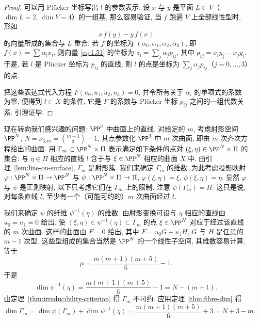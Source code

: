 \begin{proof}
	可以用 Plücker 坐标写出 $l$ 的参数表示: 设 $x$ 与 $y$ 是平面 $L \subset V$（$\dim L = 2$, $\dim V = 4$）的一组基, 那么容易验证, 当 $f$ 跑遍 $V$ 上全部线性型时, 形如
	\begin{equation}
		\label{eq:1.51}
		x\, f(y) - y\, f(x)
	\end{equation}
	的向量所成的集合与 $L$ 重合. 若 $f$ 的坐标为 $(\alpha_0, \alpha_1, \alpha_2, \alpha_3)$, 即 $f(x) = \sum \alpha_i x_i$, 则向量 \eqref{eq:1.51} 的坐标为 $z_i = \sum_j \alpha_j p_{ij}$, 其中 $p_{ij} = x_i y_j - x_j y_i$. 于是, 若 $l$ 是 Plücker 坐标为 $p_{ij}$ 的直线, 则 $l$ 的点是坐标为 $\sum_j \alpha_j p_{ij}$（$j = 0, \ldots, 3$）的点.

	把这些表达式代入方程 $F(u_0, u_1, u_2, u_3) = 0$, 并令所有关于 $\alpha_i$ 的单项式的系数为零, 便得到 $l \subset X$ 的条件, 它是 $F$ 的系数与 Plücker 坐标 $p_{ij}$ 之间的一组代数关系. 引理证毕.
\end{proof}

现在转向我们感兴趣的问题: $\PP^3$ 中曲面上的直线. 对给定的 $m$, 考虑射影空间 $\PP^N$, $N = \nu_{3,m} = \binom{m+3}{3} - 1$, 其点参数化 $\PP^3$ 中 $m$ 次曲面, 即由 $m$ 次齐次方程给出的曲面. 用 $\Gamma_m \subset \PP^N \times \Pi$ 表示满足如下条件的点对 $(\xi, \eta) \in \PP^N \times \Pi$ 的集合: 与 $\eta \in \Pi$ 相应的直线 $l$ 含于与 $\xi \in \PP^N$ 相应的曲面 $X$ 中. 由引理~\ref{lem:line-on-surface}, $\Gamma_m$ 是射影簇. 我们来确定 $\Gamma_m$ 的维数. 为此考虑投影映射 $\varphi: \PP^N \times \Pi \to \PP^N$ 与 $\psi: \PP^N \times \Pi \to \Pi$, $\varphi(\xi, \eta) = \xi$, $\psi(\xi, \eta) = \eta$. 显然 $\varphi$ 与 $\psi$ 是正则映射, 以下只考虑它们在 $\Gamma_m$ 上的限制. 注意 $\psi(\Gamma_m) = \Pi$: 这只是说, 对每条直线 $l$, 至少有一个（可能可约的）$m$ 次曲面经过 $l$.

	我们来确定 $\psi$ 的纤维 $\psi^{-1}(\eta)$ 的维数. 由射影变换可设与 $\eta$ 相应的直线由 $u_0 = u_1 = 0$ 给出. 使 $(\xi, \eta) \in \psi^{-1}(\eta) \subset \Gamma_m$ 的点 $\xi \in \PP^N$ 对应于经过该直线的 $m$ 次曲面. 这样的曲面由 $F = 0$ 给出, 其中 $F = u_0 G + u_1 H$, $G$ 与 $H$ 是任意的 $m-1$ 次型. 这些型组成的集合当然是 $\PP^N$ 的一个线性子空间, 其维数容易计算, 等于
	\begin{equation}
		\label{eq:1.52}
		\mu = \frac{m(m+1)(m+5)}{6} - 1.
	\end{equation}
	于是
	\[
		\dim \psi^{-1}(\eta) = \frac{m(m+1)(m+5)}{6} - 1 = N - (m+1).
	\]
	由定理~\ref{thm:irreducibility-criterion} 得 $\Gamma_m$ 不可约. 应用定理~\ref{thm:fibre-dim} 得
	\begin{equation}
		\label{eq:1.53}
		\dim \Gamma_m = \dim \psi(\Gamma_m) + \dim \psi^{-1}(\eta) = \frac{m(m+1)(m+5)}{6} + 3 = N + 3 - m.
	\end{equation}

